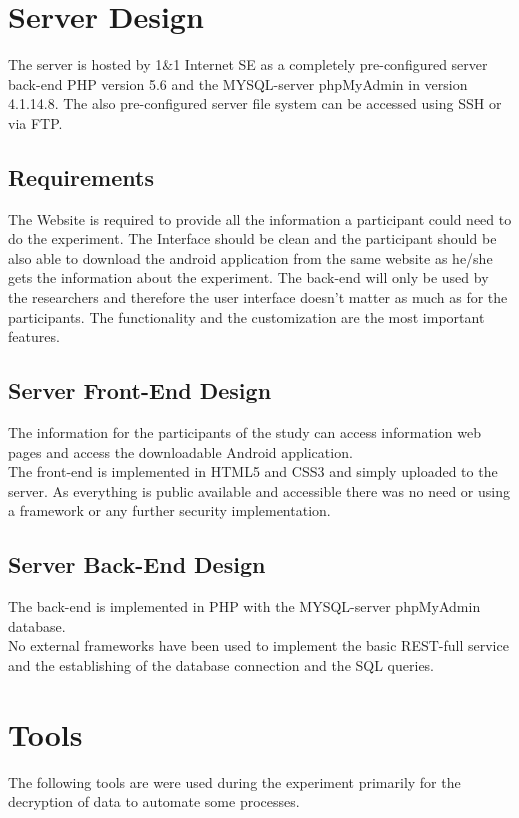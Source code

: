 \section{Server Design}
The server is hosted by 1\&1 Internet SE as a completely pre-configured server back-end PHP version 5.6 and the MYSQL-server phpMyAdmin in version 4.1.14.8. The also pre-configured server file system can be accessed using SSH or via FTP.

\subsection{Requirements}
The Website is required to provide all the information a participant could need to do the experiment. The Interface should be clean and the participant should be also able to download the android application from the same website as he/she gets the information about the experiment. 
The back-end will only be used by the researchers and therefore the user interface doesn't matter as much as for the participants. The functionality and the customization are the most important features. 

\subsection{Server Front-End Design}
The information for the participants of the study can access information web pages and access the downloadable Android application.\\
The front-end is implemented in HTML5 and CSS3 and simply uploaded to the server. As everything is public available and accessible there was no need or using a framework or any further security implementation. 

\subsection{Server Back-End Design}
The back-end is implemented in PHP with the MYSQL-server phpMyAdmin database.\\ 
No external frameworks have been used to implement the basic REST-full service and the establishing of the database connection and the SQL queries.

\section{Tools}
The following tools are were used during the experiment primarily for the decryption of data to automate some processes.


